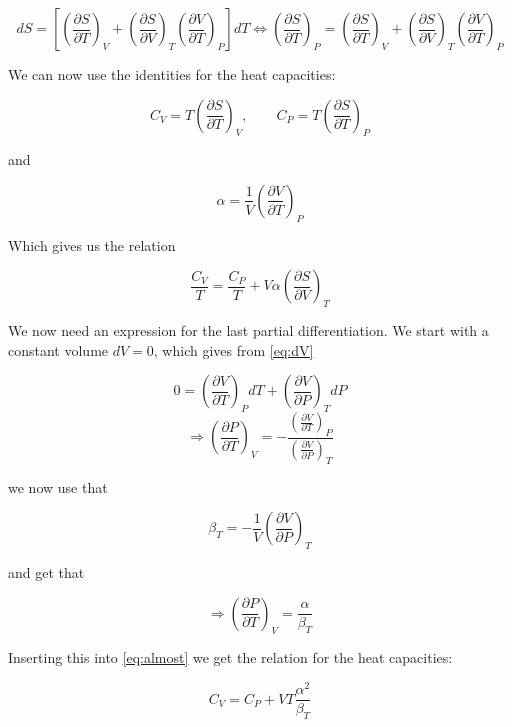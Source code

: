 \documentclass{article}
\newcommand{\pd}[2]{\frac{\partial #1}{\partial #2}}
\begin{document}
\begin{equation}
dS = \left[\left(\pd{S}{T}\right)_V + \left(\pd{S}{V}\right)_T\left(\pd{V}{T}\right)_P\right]dT \Leftrightarrow \left(\pd{S}{T}\right)_P = \left(\pd{S}{T}\right)_V + \left(\pd{S}{V}\right)_T\left(\pd{V}{T}\right)_P
\end{equation}

We can now use the identities for the heat capacities:

\begin{equation}
C_V = T\left(\pd{S}{T}\right)_V, \qquad C_P = T\left(\pd{S}{T}\right)_P
\label{eq:heatCap}
\end{equation}

and

\begin{equation}
\alpha = \frac{1}{V}\left(\pd{V}{T}\right)_P
\label{eq:alpha}
\end{equation}

Which gives us the relation

\begin{equation}
\frac{C_V}{T} = \frac{C_P}{T} + V\alpha \left(\pd{S}{V}\right)_T
\label{eq:almost}
\end{equation}

We now need an expression for the last partial differentiation. We start with a constant volume $dV = 0$, which gives from \eqref{eq:dV}

\begin{equation}
0 = \left(\pd{V}{T}\right)_P dT + \left(\pd{V}{P}\right)_T dP
\end{equation}
\begin{equation}
\Rightarrow \left(\pd{P}{T}\right)_V = - \frac{\left(\pd{V}{T}\right)_P}{\left(\pd{V}{P}\right)_T}
\end{equation}

we now use that 

\begin{equation}
\beta_T = -\frac{1}{V}\left(\pd{V}{P}\right)_T
\end{equation}

and get that

\begin{equation}
\Rightarrow \left(\pd{P}{T}\right)_V = \frac{\alpha}{\beta_T}
\end{equation}

Inserting this into \eqref{eq:almost} we get the relation for the heat capacities:

\begin{equation}
C_V = C_P + VT\frac{\alpha^2}{\beta_T}
\end{equation}
\end{document}
